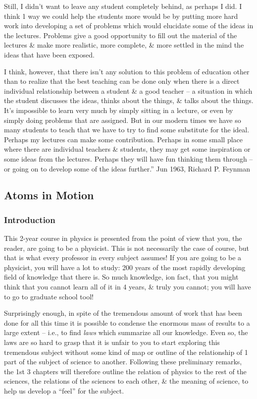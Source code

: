 \documentclass{article}
\begin{document}
Still, I didn't want to leave any student completely behind, as perhaps I did. I think 1 way we could help the students more would be by putting more hard work into developing a set of problems which would elucidate some of the ideas in the lectures. Problems give a good opportunity to fill out the material of the lectures \& make more realistic, more complete, \& more settled in the mind the ideas that have been exposed.

I think, however, that there isn't any solution to this problem of education other than to realize that the best teaching can be done only when there is a direct individual relationship between a student \& a good teacher -- a situation in which the student discusses the ideas, thinks about the things, \& talks about the things. It's impossible to learn very much by simply sitting in a lecture, or even by simply doing problems that are assigned. But in our modern times we have so many students to teach that we have to try to find some substitute for the ideal. Perhaps my lectures can make some contribution. Perhaps in some small place where there are individual teachers \& students, they may get some inspiration or some ideas from the lectures. Perhaps they will have fun thinking them through -- or going on to develop some of the ideas further.'' Jun 1963, {\sc Richard P. Feynman}

\subsection{Atoms in Motion}

\subsubsection{Introduction}
This 2-year course in physics is presented from the point of view that you, the reader, are going to be a physicist. This is not necessarily the case of course, but that is what every professor in every subject assumes! If you are going to be a physicist, you will have a lot to study: 200 years of the most rapidly developing field of knowledge that there is. So much knowledge, ion fact, that you might think that you cannot learn all of it in 4 years,  \& truly you cannot; you will have to go to graduate school tool!

Surprisingly enough, in spite of the tremendous amount of work that has been done for all this time it is possible to condense the enormous mass of results to a large extent -- i.e., to find {\it laws} which summarize all our knowledge. Even so, the laws are so hard to grasp that it is unfair to you to start exploring this tremendous subject without some kind of map or outline of the relationship of 1 part of the subject of science to another. Following these preliminary remarks, the 1st 3 chapters will therefore outline the relation of physics to the rest of the sciences, the relations of the sciences to each other, \& the meaning of science, to help us develop a ``feel'' for the subject.
\end{document}
